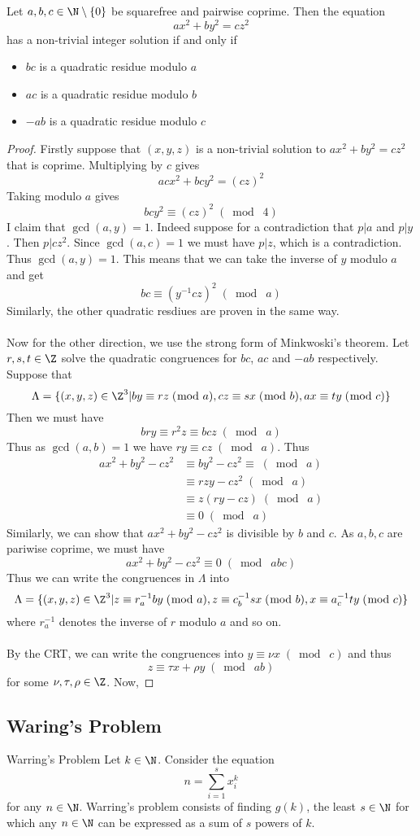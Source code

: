 \documentclass[a4paper]{article}
\begin{document}
\begin{thm}{}{} Let $a,b,c\in\N\setminus\{0\}$ be squarefree and pairwise coprime. Then the equation $$ax^2+by^2=cz^2$$ has a non-trivial integer solution if and only if 
\begin{itemize}
\item $bc$ is a quadratic residue modulo $a$
\item $ac$ is a quadratic residue modulo $b$
\item $-ab$ is a quadratic residue modulo $c$
\end{itemize} \tcbline
\begin{proof}
Firstly suppose that $(x,y,z)$ is a non-trivial solution to $ax^2+by^2=cz^2$ that is coprime. Multiplying by $c$ gives $$acx^2+bcy^2=(cz)^2$$ Taking modulo $a$ gives $$bcy^2\equiv(cz)^2\;(\bmod\;4)$$
I claim that $\gcd(a,y)=1$. Indeed suppose for a contradiction that $p|a$ and $p|y$. Then $p|cz^2$. Since $\gcd(a,c)=1$ we must have $p|z$, which is a contradiction. Thus $\gcd(a,y)=1$. This means that we can take the inverse of $y$ modulo $a$ and get $$bc\equiv(y^{-1}cz)^2\;(\bmod\;a)$$ Similarly, the other quadratic resdiues are proven in the same way. \\~\\
Now for the other direction, we use the strong form of Minkwoski's theorem. Let $r,s,t\in\Z$ solve the quadratic congruences for $bc$, $ac$ and $-ab$ respectively. Suppose that $$\Lambda=\{(x,y,z)\in\Z^3|by\equiv rz\;(\bmod\;a), cz\equiv sx\;(\bmod\;b), ax\equiv ty\;(\bmod\;c)\}$$ Then we must have $$bry\equiv r^2z\equiv bcz\;(\bmod\;a)$$ Thus as $\gcd(a,b)=1$ we have $ry\equiv cz\;(\bmod\;a)$. Thus 
\begin{align*}
ax^2+by^2-cz^2&\equiv by^2-cz^2\equiv\;(\bmod\;a)\\
&\equiv rzy-cz^2\;(\bmod\;a)\\
&\equiv z(ry-cz)\;(\bmod\;a)\\
&\equiv 0\;(\bmod\;a)
\end{align*}
Similarly, we can show that $ax^2+by^2-cz^2$ is divisible by $b$ and $c$. As $a,b,c$ are pariwise coprime, we must have $$ax^2+by^2-cz^2\equiv 0\;(\bmod\;abc)$$
Thus we can write the congruences in $\Lambda$ into $$\Lambda=\{(x,y,z)\in\Z^3|z\equiv r_a^{-1}by\;(\bmod\;a), z\equiv c_b^{-1}sx\;(\bmod\;b), x\equiv a_c^{-1}ty\;(\bmod\;c)\}$$ where $r_a^{-1}$ denotes the inverse of $r$ modulo $a$ and so on. \\~\\
By the CRT, we can write the congruences into $y\equiv\nu x\;(\bmod\;c)$ and thus $$z\equiv\tau x+\rho y\;(\bmod\;ab)$$ for some $\nu, \tau, \rho\in\Z$. Now, 
\end{proof}
\end{thm}

\subsection{Waring's Problem}
\begin{defn}{Warring's Problem}{} Let $k\in\N$. Consider the equation $$n=\sum_{i=1}^sx_i^k$$ for any $n\in\N$. Warring's problem consists of finding $g(k)$, the least $s\in\N$ for which any $n\in\N$ can be expressed as a sum of $s$ powers of $k$. 
\end{defn}
\end{document}
